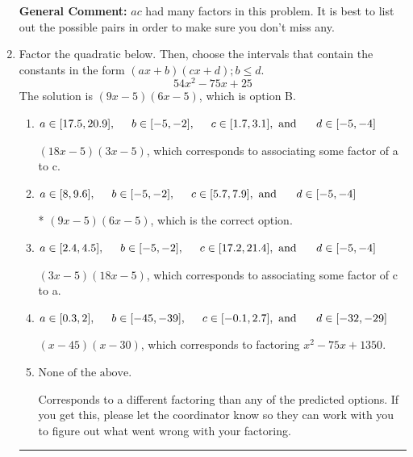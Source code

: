 \documentclass{extbook}[14pt]
\newcommand{\litem}[1]{\item #1

\rule{\textwidth}{0.4pt}}
\begin{document}
\begin{enumerate}
{\textbf{General Comment:} $ac$ had many factors in this problem. It is best to list out the possible pairs in order to make sure you don't miss any.
}
\litem{
Factor the quadratic below. Then, choose the intervals that contain the constants in the form $(ax+b)(cx+d); b \leq d.$
\[ 54x^{2} -75 x + 25 \]The solution is \( (9x -5)(6x -5) \), which is option B.\begin{enumerate}[label=\Alph*.]
\item \( a \in [17.5, 20.9], \hspace*{5mm} b \in [-5, -2], \hspace*{5mm} c \in [1.7, 3.1], \text{ and } \hspace*{5mm} d \in [-5, -4] \)

 $(18x -5)(3x -5)$, which corresponds to associating some factor of a to c.
\item \( a \in [8, 9.6], \hspace*{5mm} b \in [-5, -2], \hspace*{5mm} c \in [5.7, 7.9], \text{ and } \hspace*{5mm} d \in [-5, -4] \)

* $(9x -5)(6x -5)$, which is the correct option.
\item \( a \in [2.4, 4.5], \hspace*{5mm} b \in [-5, -2], \hspace*{5mm} c \in [17.2, 21.4], \text{ and } \hspace*{5mm} d \in [-5, -4] \)

 $(3x -5)(18x -5)$, which corresponds to associating some factor of c to a.
\item \( a \in [0.3, 2], \hspace*{5mm} b \in [-45, -39], \hspace*{5mm} c \in [-0.1, 2.7], \text{ and } \hspace*{5mm} d \in [-32, -29] \)

 $(x -45)(x -30)$, which corresponds to factoring $x^{2} -75 x + 1350$.
\item \( \text{None of the above.} \)

 Corresponds to a different factoring than any of the predicted options. If you get this, please let the coordinator know so they can work with you to figure out what went wrong with your factoring.
\end{enumerate}

}
\end{enumerate}
\end{document}
